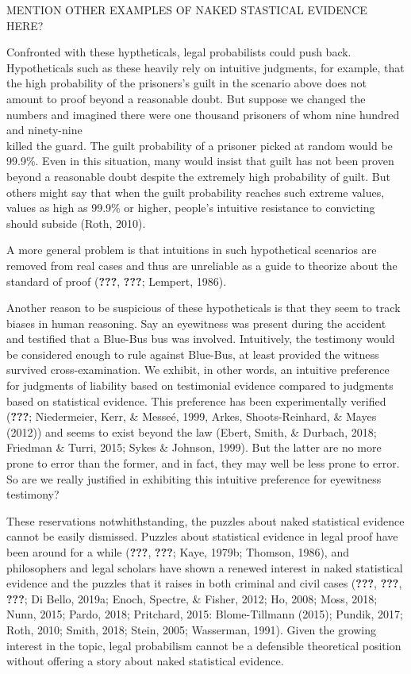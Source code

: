 \documentclass[10pt,dvipsnames,enabledeprecatedfontcommands]{scrartcl}
\begin{document}
MENTION OTHER EXAMPLES OF NAKED STASTICAL EVIDENCE HERE?

Confronted with these hyptheticals, legal probabilists could push back.
Hypotheticals such as these heavily rely on intuitive judgments, for
example, that the high probability of the prisoners's guilt in the
scenario above does not amount to proof beyond a reasonable doubt. But
suppose we changed the numbers and imagined there were one thousand
prisoners of whom nine hundred and ninety-nine\\
killed the guard. The guilt probability of a prisoner picked at random
would be 99.9\%. Even in this situation, many would insist that guilt
has not been proven beyond a reasonable doubt despite the extremely high
probability of guilt. But others might say that when the guilt
probability reaches such extreme values, values as high as 99.9\% or
higher, people's intuitive resistance to convicting should subside
(Roth, 2010).

A more general problem is that intuitions in such hypothetical scenarios
are removed from real cases and thus are unreliable as a guide to
theorize about the standard of proof ({\textbf{???}}, {\textbf{???}};
Lempert, 1986).

Another reason to be suspicious of these hypotheticals is that they seem
to track biases in human reasoning. Say an eyewitness was present during
the accident and testified that a Blue-Bus bus was involved.
Intuitively, the testimony would be considered enough to rule against
Blue-Bus, at least provided the witness survived cross-examination. We
exhibit, in other words, an intuitive preference for judgments of
liability based on testimonial evidence compared to judgments based on
statistical evidence. This preference has been experimentally verified
({\textbf{???}}; Niedermeier, Kerr, \& Messeé, 1999, Arkes,
Shoots-Reinhard, \& Mayes (2012)) and seems to exist beyond the law
(Ebert, Smith, \& Durbach, 2018; Friedman \& Turri, 2015; Sykes \&
Johnson, 1999). But the latter are no more prone to error than the
former, and in fact, they may well be less prone to error. So are we
really justified in exhibiting this intuitive preference for eyewitness
testimony?

These reservations notwhithstanding, the puzzles about naked statistical
evidence cannot be easily dismissed. Puzzles about statistical evidence
in legal proof have been around for a while ({\textbf{???}},
{\textbf{???}}; Kaye, 1979b; Thomson, 1986), and philosophers and legal
scholars have shown a renewed interest in naked statistical evidence and
the puzzles that it raises in both criminal and civil cases
({\textbf{???}}, {\textbf{???}}, {\textbf{???}}; Di Bello, 2019a; Enoch,
Spectre, \& Fisher, 2012; Ho, 2008; Moss, 2018; Nunn, 2015; Pardo, 2018;
Pritchard, 2015: Blome-Tillmann (2015); Pundik, 2017; Roth, 2010; Smith,
2018; Stein, 2005; Wasserman, 1991). Given the growing interest in the
topic, legal probabilism cannot be a defensible theoretical position
without offering a story about naked statistical evidence.
\end{document}
